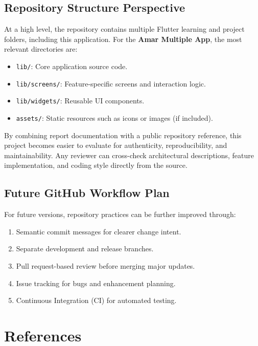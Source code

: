 \documentclass{article}
\begin{document}
\subsection{Repository Structure Perspective}
At a high level, the repository contains multiple Flutter learning and project folders, including this application. For the \textbf{Amar Multiple App}, the most relevant directories are:
\begin{itemize}
\item \texttt{lib/}: Core application source code.
\item \texttt{lib/screens/}: Feature-specific screens and interaction logic.
\item \texttt{lib/widgets/}: Reusable UI components.
\item \texttt{assets/}: Static resources such as icons or images (if included).
\end{itemize}

\begin{insightbox}
By combining report documentation with a public repository reference, this project becomes easier to evaluate for authenticity, reproducibility, and maintainability. Any reviewer can cross-check architectural descriptions, feature implementation, and coding style directly from the source.
\end{insightbox}

\subsection{Future GitHub Workflow Plan}
For future versions, repository practices can be further improved through:
\begin{enumerate}
\item Semantic commit messages for clearer change intent.
\item Separate development and release branches.
\item Pull request-based review before merging major updates.
\item Issue tracking for bugs and enhancement planning.
\item Continuous Integration (CI) for automated testing.
\end{enumerate}


\newpage
\section*{References}
\end{document}
